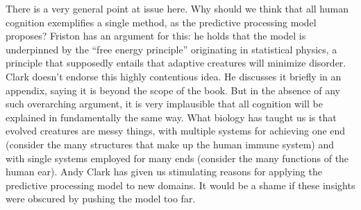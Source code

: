 There is a very general point at issue here. Why should we think that all human cognition exemplifies a single method, as the predictive processing model proposes? Friston has an argument for this: he holds that the model is underpinned by the ``free energy principle'' originating in statistical physics, a principle that supposedly entails that adaptive creatures will minimize disorder. Clark doesn't endorse this highly contentious idea. He discusses it briefly in an appendix, saying it is beyond the scope of the book. But in the absence of any such overarching argument, it is very implausible that all cognition will be explained in fundamentally the same way. What biology has taught us is that evolved creatures are messy things, with multiple systems for achieving one end (consider the many structures that make up the human immune system) and with single systems employed for many ends (consider the many functions of the human ear). Andy Clark has given us stimulating reasons for applying the predictive processing model to new domains. It would be a shame if these insights were obscured by pushing the model too far.


